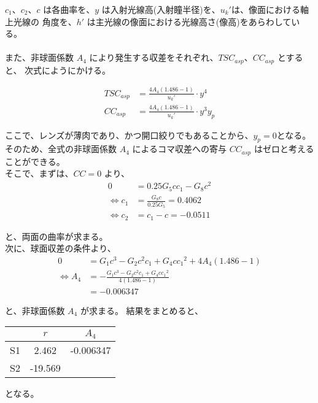 \documentclass[a4paper,10pt]{jsarticle}
\begin{document}
$c_1$、$c_2$、$c$ は各曲率を、$y$ は入射光線高(入射瞳半径)を、$u_{k}'$は、像面における軸上光線の
角度を、$h'$ は主光線の像面における光線高さ(像高)をあらわしている。\\
\\
また、非球面係数 $A_4$ により発生する収差をそれぞれ、$TSC_{asp}$、$CC_{asp}$ とすると、
次式にようにかける。

\begin{align*}
TSC_{asp} &= \frac{4 A_4 (1.486-1)}{u_{k}'} \cdot y^4 \\
CC_{asp} &= \frac{4 A_4 (1.486-1)}{u_{k}'} \cdot y^3 y_p
\end{align*}

ここで、レンズが薄肉であり、かつ開口絞りでもあることから、$y_p = 0$となる。
そのため、全式の非球面係数 $A_4$ によるコマ収差への寄与 $CC_{asp}$ はゼロと考えることができる。\\
そこで、まずは、$CC=0$ より、
\begin{align*}
0 &= 0.25 G_5 c c_1 - G_8 c^2 \\
\Leftrightarrow c_1 &= \frac{G_8 c}{0.25 G_5} = 0.4062 \\
\Leftrightarrow c_2 &= c_1 - c = -0.0511 
\end{align*}

と、両面の曲率が求まる。\\

次に、球面収差の条件より、
\begin{align*}
0 &= G_1 c^3 - G_2 c^2 c_1 + G_4 c {c_1}^2 + 4 A_4 (1.486-1) \\
\Leftrightarrow A_4 &= - \frac{G_1 c^3 - G_2 c^2 c_1 + G_4 c {c_1}^2}{4(1.486-1)} \\
&= -0.006347
\end{align*}

と、非球面係数 $A_4$ が求まる。
結果をまとめると、
\begin{center}
\begin{tabular}{c|cc}
& $r$ & $A_4$ \\ \hline
S1 & 2.462 & -0.006347 \\
S2 & -19.569 & \\ \hline 
\end{tabular}
\end{center}
となる。





\section{}
\end{document}
